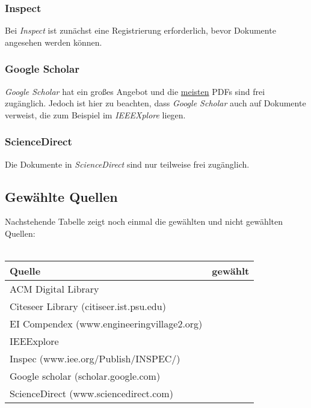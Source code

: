 \subsubsection{Inspect}
Bei \textit{Inspect} ist zunächst eine Registrierung erforderlich, bevor Dokumente angesehen werden können.

\subsubsection{Google Scholar}
\textit{Google Scholar} hat ein großes Angebot und die \underline{meisten} PDFs sind frei zugänglich. Jedoch ist hier zu beachten, dass \textit{Google Scholar} auch auf Dokumente verweist, die zum Beispiel im \textit{IEEEXplore} liegen.

\subsubsection{ScienceDirect}
Die Dokumente in \textit{ScienceDirect} sind nur teilweise frei zugänglich.

\subsection{Gewählte Quellen}
Nachstehende Tabelle zeigt noch einmal die gewählten und nicht gewählten Quellen:
\\\\
\begin{tabular}[]{|L{10cm}|l|}
	\hline
	 \textbf{Quelle} & \textbf{gewählt}  \\ 
	\hline
	ACM Digital Library & \redX \\ 
	\hline
	Citeseer Library (citiseer.ist.psu.edu) & \redX  \\ 
	\hline
	EI Compendex (www.engineeringvillage2.org) & \redX  \\ 
	\hline
	IEEExplore & \greenchecked  \\ 
	\hline
	Inspec (www.iee.org/Publish/INSPEC/) & \redX \\ 
	\hline
	Google scholar (scholar.google.com) & \greenchecked \\ 
	\hline
	ScienceDirect (www.sciencedirect.com) & \redX  \\
	\hline
\end{tabular} 

